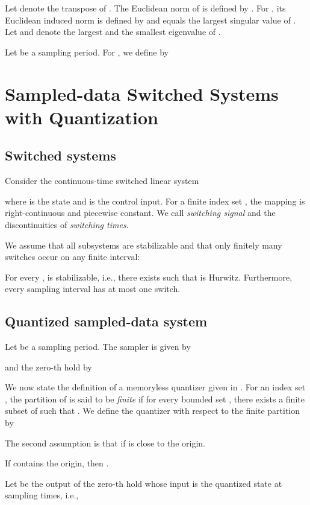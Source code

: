 \documentclass[a4, 11pt]{article}
\begin{document}
Let  denote the transpose of .
The Euclidean norm of  is defined by
.
For , its Euclidean induced norm is
defined by  and
equals the largest singular value of .
Let  and  denote
the largest and the smallest eigenvalue of .

Let  be a sampling period. For ,
we define  by


\section{Sampled-data Switched Systems with Quantization}
\subsection{Switched systems}
Consider the continuous-time switched linear system

where  is the state and 
 is the control input.
For a finite index set , the mapping 
 is right-continuous and piecewise constant.
We call  \textit{switching signal} and the discontinuities of  
\textit{switching times}.

We assume that all subsystems are stabilizable and that
only finitely many switches occur on any finite interval:
\begin{assumption}
\label{ass:system}
For every ,  is stabilizable, i.e., 
there exists  such that
 is Hurwitz. 
Furthermore, every sampling interval has 
at most one switch.
\end{assumption}

\subsection{Quantized sampled-data system}
Let  be a sampling period.
The sampler  is given by

and
the zero-th hold  by



We now state the definition of a memoryless quantizer  given in \cite{Ishii2004}.
For an index set ,
the partition  
of  is 
said to be \textit{finite} if for every bounded set , there exists a
finite subset  of  such that
.
We define
the quantizer  
with respect to the finite partition 
by


The second assumption is that  if  is close to the origin. 
\begin{assumption}
\label{ass:quantization_near_origin}
If  contains the origin, then .
\end{assumption}

Let  be the output of the zero-th hold whose input is 
the quantized state at sampling times, i.e.,
\end{document}
